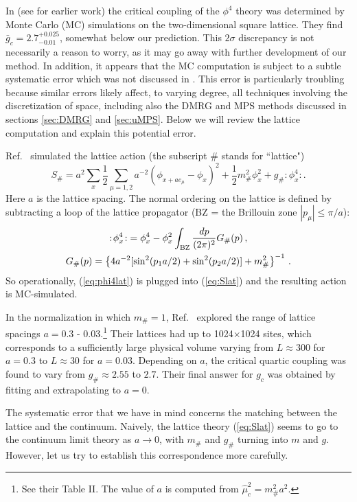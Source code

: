 \documentclass[11pt]{article}
\newcommand{\reef}[1]{(\ref{#1})}
\newcommand{\beq}{\begin{equation}}
\newcommand{\eeq}{\end{equation}}
\def\half{{\textstyle\frac 12}}
\def\le{\leqslant}
\newcommand{\NO}[1]{{:\!#1\!:}}
\def \lat{{\#}}
\numberwithin{equation}{section}
\begin{document}
In \cite{Schaich:2009jk} (see \cite{Loinaz:1997az} for earlier work) the critical coupling of the $\phi^4$ theory was determined by Monte Carlo (MC) simulations on the two-dimensional square lattice. They find $\bar g_c=2.7^{+0.025}_{-0.01}$, somewhat below our prediction. This $2\sigma$ discrepancy is not necessarily a reason to worry,
as it may go away with further development of our method. In addition, it appears that the MC computation is subject to a subtle systematic error which was not discussed in \cite{Schaich:2009jk}. This error is particularly troubling because similar errors likely affect, to varying degree, all techniques involving the discretization of space, including also the DMRG and MPS methods discussed in sections \ref{sec:DMRG} and \ref{sec:uMPS}. Below we will review the lattice computation and explain this potential error.

Ref.~\cite{Schaich:2009jk} simulated the lattice action (the subscript $\lat$ stands for ``lattice")
\beq
S_\lat=a^2\sum _x \half \sum_{\mu=1,2}a^{-2}(\phi_{x+a e_\mu}-\phi_x)^2+\half m_\lat^2 \phi_x^2+g_\lat\NO{\phi^4_x}.\label{eq:Slat}
\eeq
Here $a$ is the lattice spacing. The normal ordering on the lattice is defined by subtracting a loop of the lattice propagator (BZ = the Brillouin zone $|p_\mu|\le \pi/a$):
\begin{gather}
\NO{\phi^4_x}=\phi_x^4-\phi_x^2\int_{\rm BZ} \frac{dp}{(2\pi)^2} G_\lat(p)\,,\label{eq:phi4lat}\\
G_\lat(p)=\left\{4a^{-2}[\sin^2 (p_1 a/2)+\sin^2 (p_2 a/2)]+m_\lat^2\right\}^{-1}\,. \label{eq:Glat}
\end{gather}
So operationally, \reef{eq:phi4lat} is plugged into \reef{eq:Slat} and the resulting action is MC-simulated.

In the normalization in which $m_{\lat}=1$, Ref.~\cite{Schaich:2009jk} explored the range of lattice spacings $a=0.3$ - $0.03$.\footnote{See their Table II. The value of $a$ is computed from $\hat \mu_c^2 =m^2_{\lat} a^2$.} Their lattices had up to 1024$\times$1024 sites, which corresponds to a sufficiently large physical volume varying from $L\approx 300$ for $a=0.3$ to $L\approx 30$ for $a=0.03$. Depending on $a$, the critical quartic coupling was found to vary from $g_\lat\approx 2.55$ to $2.7$. Their final answer for $g_c$ was obtained by fitting and extrapolating to $a=0$.

The systematic error that we have in mind concerns the matching between the lattice and the continuum. Naively, the lattice theory \reef{eq:Slat} seems to go to the continuum limit theory as $a\to0$, with $m_\lat$ and $g_\lat$ turning into $m$ and $g$. However, let us try to establish this correspondence more carefully. 
\end{document}
